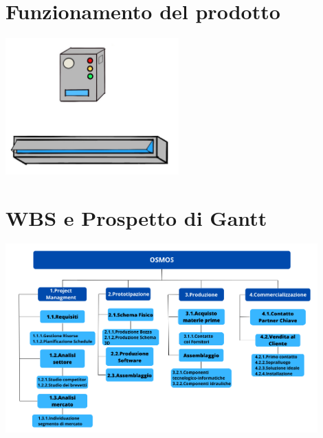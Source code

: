 \documentclass[a4paper, 12pt]{article}
\begin{document}
	\section{Funzionamento del prodotto}
	\begin{center}
		\includegraphics[width=0.5\textwidth]{Images/prototipo.jpg}
	\end{center}
	\section{WBS e Prospetto di Gantt}
	\begin{center}
		\includegraphics[width=0.9\textwidth]{Images/WBS.png}
	\end{center}
\end{document}

